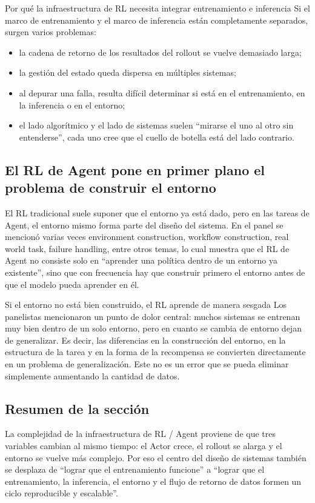 \begin{knowledgebox}{Por qué la infraestructura de RL necesita integrar entrenamiento e inferencia}
Si el marco de entrenamiento y el marco de inferencia están completamente separados, surgen varios problemas:
\begin{itemize}
  \item la cadena de retorno de los resultados del rollout se vuelve demasiado larga;
  \item la gestión del estado queda dispersa en múltiples sistemas;
  \item al depurar una falla, resulta difícil determinar si está en el entrenamiento, en la inferencia o en el entorno;
  \item el lado algorítmico y el lado de sistemas suelen ``mirarse el uno al otro sin entenderse'', cada uno cree que el cuello de botella está del lado contrario.
\end{itemize}
\end{knowledgebox}

\subsection{El RL de Agent pone en primer plano el problema de construir el entorno}
El RL tradicional suele suponer que el entorno ya está dado, pero en las tareas de Agent, el entorno mismo forma parte del diseño del sistema. En el panel se mencionó varias veces environment construction, workflow construction, real world task, failure handling, entre otros temas, lo cual muestra que el RL de Agent no consiste solo en ``aprender una política dentro de un entorno ya existente'', sino que con frecuencia hay que construir primero el entorno antes de que el modelo pueda aprender en él.

\begin{warningbox}{Si el entorno no está bien construido, el RL aprende de manera sesgada}
Los panelistas mencionaron un punto de dolor central: muchos sistemas se entrenan muy bien dentro de un solo entorno, pero en cuanto se cambia de entorno dejan de generalizar. Es decir, las diferencias en la construcción del entorno, en la estructura de la tarea y en la forma de la recompensa se convierten directamente en un problema de generalización. Este no es un error que se pueda eliminar simplemente aumentando la cantidad de datos.
\end{warningbox}

\subsection{Resumen de la sección}
La complejidad de la infraestructura de RL / Agent proviene de que tres variables cambian al mismo tiempo: el Actor crece, el rollout se alarga y el entorno se vuelve más complejo. Por eso el centro del diseño de sistemas también se desplaza de ``lograr que el entrenamiento funcione'' a ``lograr que el entrenamiento, la inferencia, el entorno y el flujo de retorno de datos formen un ciclo reproducible y escalable''.
